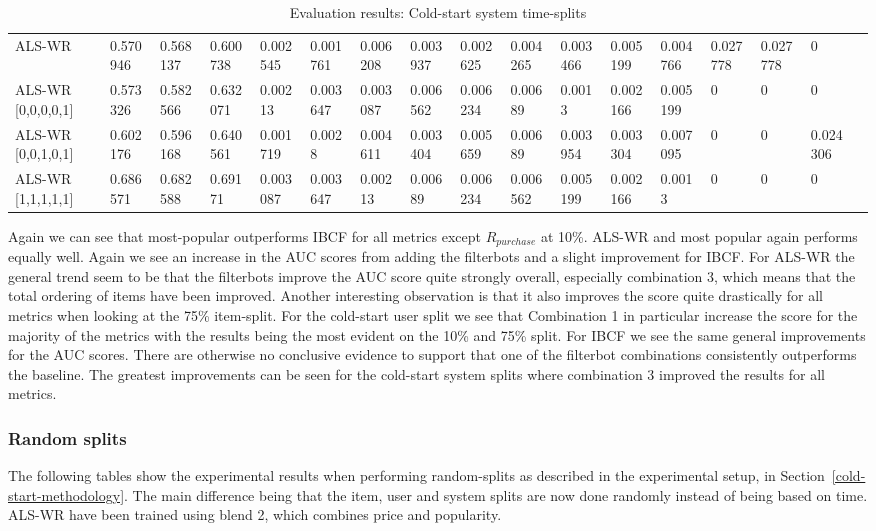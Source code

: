 \begin{table}[H]
{\begin{tabular}{*{17}{l}}
\rowcolor{Gray}
ALS-WR 				&	0.570946&	0.568137&	0.600738&	0.002545&	0.001761&	0.006208&	0.003937&	0.002625&	0.004265&	0.003466&	0.005199&	0.004766&	0.027778&	0.027778	&	0 & \\
ALS-WR [0,0,0,0,1] &	0.573326&	0.582566&	0.632071&	0.00213&	0.003647&	0.003087&	0.006562&	0.006234&	0.00689	&	0.0013&	0.002166&	0.005199&	0	&	0	&	0	& \\
ALS-WR [0,0,1,0,1] 	& 	0.602176&	0.596168&	0.640561&	0.001719&	0.0028&	0.004611&	0.003404&	0.005659&	0.00689	&	0.003954&	0.003304&	0.007095&	0	&	0	&	0.024306	& \\
ALS-WR [1,1,1,1,1]  & 	0.686571&	0.682588&	0.69171	&	0.003087&	0.003647&	0.00213&	0.00689&	0.006234&	0.006562&	0.005199&	0.002166&	0.0013&	0&	0&	0	& \\

\bottomrule
\end{tabular}
}

\caption{Evaluation results: Cold-start system time-splits}
\end{table}

Again we can see that most-popular outperforms IBCF for all metrics except $R_{purchase}$ at 10\%. ALS-WR and most popular again performs equally well.
Again we see an increase in the AUC scores from adding the filterbots and a slight improvement for IBCF. For ALS-WR the general trend seem to be that the filterbots
improve the AUC score quite strongly overall, especially combination 3, which means that the total ordering of items have been improved. Another interesting observation
is that it also improves the score quite drastically for all metrics when looking at the 75\% item-split. For the cold-start user split we see that Combination 1 in particular
increase the score for the majority of the metrics with the results being the most evident on the 10\% and 75\% split. For IBCF we see the same general improvements for the AUC scores.
There are otherwise no conclusive evidence to support that one of the filterbot combinations consistently outperforms the baseline. The greatest improvements can be seen for the cold-start
system splits where combination 3 improved the results for all metrics.

\subsubsection{Random splits}


The following tables show the experimental results when performing random-splits as described in the experimental setup, in Section~\ref{cold-start-methodology}.
The main difference being that the item, user and system splits are now done randomly instead of being based on time.
ALS-WR have been trained using blend 2, which combines price and popularity.

